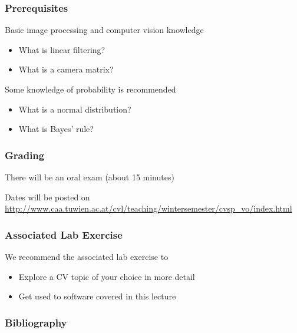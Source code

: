 \documentclass[xetex,professionalfont]{beamer}
\begin{document}

\begin{frame}
\frametitle{Prerequisites}

Basic image processing and computer vision knowledge
\begin{itemize}
	\item What is linear filtering?
	\item What is a camera matrix?
\end{itemize}

\bigskip
Some knowledge of probability is recommended
\begin{itemize}
	\item What is a normal distribution?
	\item What is Bayes' rule?
\end{itemize}

\end{frame}


\begin{frame}
\frametitle{Grading}

There will be an oral exam (about 15 minutes)

\bigskip
Dates will be posted on \url{http://www.caa.tuwien.ac.at/cvl/teaching/wintersemester/cvsp_vo/index.html}

\end{frame}


\begin{frame}
\frametitle{Associated Lab Exercise}

We recommend the associated lab exercise to
\begin{itemize}
	\item Explore a CV topic of your choice in more detail
	\item Get used to software covered in this lecture
\end{itemize}

\end{frame}


\begin{frame}
\frametitle{Bibliography}

\printbibliography

\end{frame}
\end{document}

